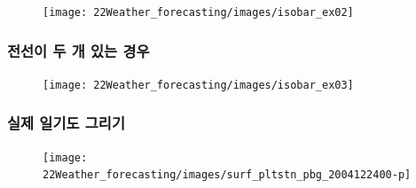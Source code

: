 \begin{figure}[h]\center
	\centering
	\texttt{[image: 22Weather\_forecasting/images/isobar\_ex02]}
	\label{fig:isobar_ex02}
\end{figure}

\newpage
\subsubsection{전선이 두 개 있는 경우}

\begin{figure}[h]\center
	\centering
	\texttt{[image: 22Weather\_forecasting/images/isobar\_ex03]}
	\label{fig:isobar_ex03}
\end{figure}

\newpage
\subsubsection{실제 일기도 그리기}

\begin{figure}[h!]\center
	\centering
	\texttt{[image: 22Weather\_forecasting/images/surf\_pltstn\_pbg\_2004122400-p]}
	\label{fig:drawweathermap03}
\end{figure}

